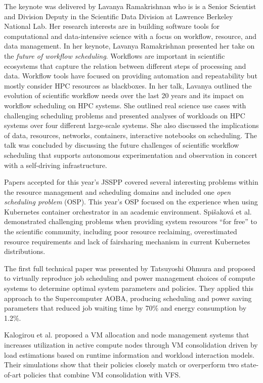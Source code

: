 \documentclass{llncs}
\begin{document}
The keynote was delivered by Lavanya Ramakrishnan who is is a Senior Scientist and Division Deputy in 
the Scientific Data Division at Lawrence Berkeley National Lab. Her research interests are in building 
software tools for computational and data-intensive science with a focus on workflow, resource, and 
data management. In her keynote, Lavanya Ramakrishnan presented her take on the \emph{future of workflow
scheduling}. Workflows are important in scientific ecosystems that capture the relation between different 
steps of processing and data. Workflow tools have focused on providing automation and repeatability but 
mostly consider HPC resources as blackboxes. In her talk, Lavanya outlined the evolution of scientific 
workflow needs over the last 20 years and its impact on workflow scheduling on HPC systems. 
She outlined real science use cases with challenging scheduling problems and presented analyses 
of workloads on HPC systems over four different large-scale systems. She also discussed the implications 
of data, resources, networks, containers, interactive notebooks on scheduling. The talk was concluded 
by discussing the future challenges of scientific workflow scheduling that supports autonomous 
experimentation and observation in concert with a self-driving infrastructure. 

Papers accepted for this year's JSSPP covered several interesting problems within the
resource management and scheduling domains and included one \emph{open scheduling problem} (OSP).
This year's OSP focused on the experience when using Kubernetes container orchestrator in an academic
environment. Spi\v{s}akov\'{a} et al. demonstrated challenging problems when providing
system resources ``for free'' to the scientific community, including poor resource reclaiming,
overestimated resource requirements and lack of fairsharing mechanism in current Kubernetes distributions.

The first full technical paper was presented by Tatsuyoshi Ohmura and proposed to virtually reproduce job
scheduling and power management choices of compute systems to determine optimal system parameters and
policies. They applied this approach to the Supercomputer AOBA, producing scheduling 
and power saving parameters that reduced job waiting time by 70\% and energy consumption by 1.2\%.

Kalogirou et al. proposed a VM allocation and node management systems that increases utilization
in active compute nodes through VM consolidation driven by load estimations based on runtime
information and workload interaction models. Their simulations show that their policies closely match
or overperform two state-of-art policies that combine VM consolidation with VFS.
\end{document}
